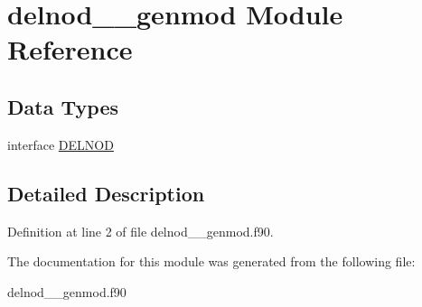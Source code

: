 \hypertarget{classdelnod____genmod}{\section{delnod\+\_\+\+\_\+genmod Module Reference}
\label{classdelnod____genmod}
}
\subsection*{Data Types}
\begin{DoxyCompactItemize}
\item 
interface \hyperlink{interfacedelnod____genmod_1_1_d_e_l_n_o_d}{D\+E\+L\+N\+O\+D}
\end{DoxyCompactItemize}


\subsection{Detailed Description}


Definition at line 2 of file delnod\+\_\+\+\_\+genmod.\+f90.



The documentation for this module was generated from the following file\+:\begin{DoxyCompactItemize}
\item 
delnod\+\_\+\+\_\+genmod.\+f90\end{DoxyCompactItemize}
